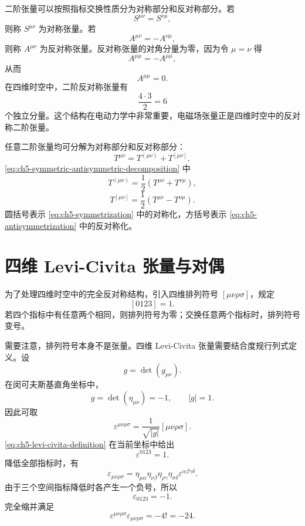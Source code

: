 二阶张量可以按照指标交换性质分为对称部分和反对称部分。若
\[
S^{\mu\nu}=S^{\nu\mu},
\]
则称 $S^{\mu\nu}$ 为对称张量。若
\[
A^{\mu\nu}=-A^{\nu\mu},
\]
则称 $A^{\mu\nu}$ 为反对称张量。反对称张量的对角分量为零，因为令 $\mu=\nu$ 得
\[
A^{\mu\mu}=-A^{\mu\mu},
\]
从而
\[
A^{\mu\mu}=0.
\]
在四维时空中，二阶反对称张量有
\[
\frac{4\cdot 3}{2}=6
\]
个独立分量。这个结构在电动力学中非常重要，电磁场张量正是四维时空中的反对称二阶张量。

任意二阶张量均可分解为对称部分和反对称部分：
\begin{equation}
\label{eq:ch5-symmetric-antisymmetric-decomposition}
T^{\mu\nu}=T^{(\mu\nu)}+T^{[\mu\nu]},
\end{equation}
\eqref{eq:ch5-symmetric-antisymmetric-decomposition} 中
\begin{equation}
\label{eq:ch5-symmetrization}
T^{(\mu\nu)}=\frac{1}{2}(T^{\mu\nu}+T^{\nu\mu}),
\end{equation}
\begin{equation}
\label{eq:ch5-antisymmetrization}
T^{[\mu\nu]}=\frac{1}{2}(T^{\mu\nu}-T^{\nu\mu}).
\end{equation}
圆括号表示 \eqref{eq:ch5-symmetrization} 中的对称化，方括号表示 \eqref{eq:ch5-antisymmetrization} 中的反对称化。

\section{四维 Levi-Civita 张量与对偶}

为了处理四维时空中的完全反对称结构，引入四维排列符号 $[\mu\nu\rho\sigma]$，规定
\[
[0123]=1.
\]
若四个指标中有任意两个相同，则排列符号为零；交换任意两个指标时，排列符号变号。

需要注意，排列符号本身不是张量。四维 Levi-Civita 张量需要结合度规行列式定义。设
\[
g=\det(g_{\mu\nu}).
\]
在闵可夫斯基直角坐标中，
\[
g=\det(\eta_{\mu\nu})=-1,
\qquad
|g|=1.
\]
因此可取
\begin{equation}
\label{eq:ch5-levi-civita-definition}
\varepsilon^{\mu\nu\rho\sigma}
=
\frac{1}{\sqrt{|g|}}[\mu\nu\rho\sigma].
\end{equation}
\eqref{eq:ch5-levi-civita-definition} 在当前坐标中给出
\[
\varepsilon^{0123}=1.
\]
降低全部指标时，有
\[
\varepsilon_{\mu\nu\rho\sigma}
=
\eta_{\mu\alpha}\eta_{\nu\beta}\eta_{\rho\gamma}\eta_{\sigma\delta}
\varepsilon^{\alpha\beta\gamma\delta}.
\]
由于三个空间指标降低时各产生一个负号，所以
\[
\varepsilon_{0123}=-1.
\]
完全缩并满足
\[
\varepsilon^{\mu\nu\rho\sigma}\varepsilon_{\mu\nu\rho\sigma}=-4!=-24.
\]

